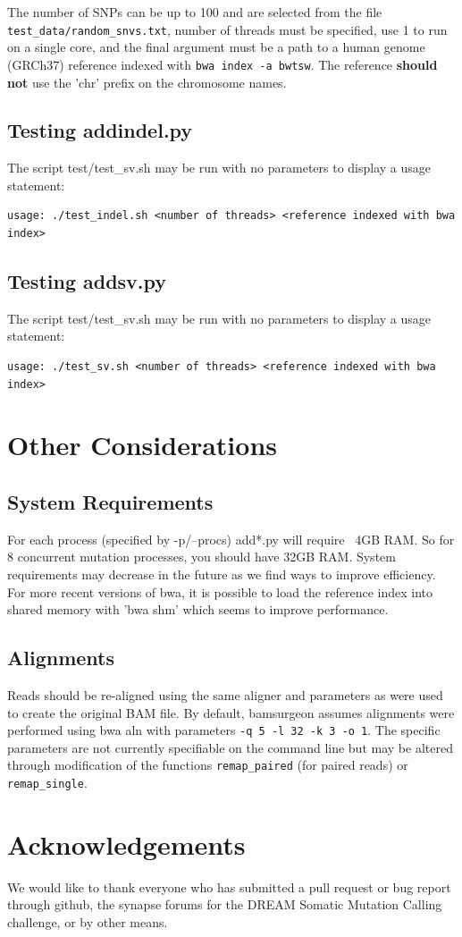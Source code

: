 \documentclass[letterpaper,11pt]{article}
\begin{document}
The number of SNPs can be up to 100 and are selected from the file \texttt{test\_data/random\_snvs.txt}, number of threads must be specified, use 1 to run on a single core, and the final argument must be a path to a human genome (GRCh37) reference indexed with \texttt{bwa index -a bwtsw}. The reference \textbf{should not} use the 'chr' prefix on the chromosome names.

\subsection{Testing addindel.py}
The script {test/test\_sv.sh} may be run with no parameters to display a usage statement:
\begin{verbatim}
usage: ./test_indel.sh <number of threads> <reference indexed with bwa index>
\end{verbatim}

\subsection{Testing addsv.py}
The script {test/test\_sv.sh} may be run with no parameters to display a usage statement:
\begin{verbatim}
usage: ./test_sv.sh <number of threads> <reference indexed with bwa index>
\end{verbatim}



\section{Other Considerations}
\subsection{System Requirements}
For each process (specified by -p/--procs) add*.py will require ~4GB RAM. So for 8 concurrent mutation processes, you should have 32GB RAM. System requirements may decrease in the future as we find ways to improve efficiency. For more recent versions of bwa, it is possible to load the reference index into shared memory with 'bwa shm' which seems to improve performance.

\subsection{Alignments}
Reads should be re-aligned using the same aligner and parameters as were used to create the original BAM file. By default, bamsurgeon assumes alignments were performed using bwa aln with parameters \texttt{-q 5 -l 32 -k 3 -o 1}. The specific parameters are not currently specifiable on the command line but may be altered through modification of the functions \texttt{remap\_paired} (for paired reads) or \texttt{remap\_single}.

\section{Acknowledgements}
We would like to thank everyone who has submitted a pull request or bug report through github, the synapse forums for the DREAM Somatic Mutation Calling challenge, or by other means.
\end{document}
